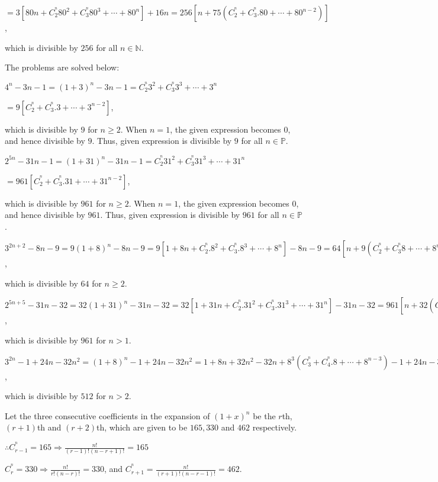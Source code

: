   $= 3[80n + C_2^^n80^2 + C_3^^n80^3 + \cdots + 80^n] + 16n = 256[n + 75(C_2^^n + C_3^^n.80 + \cdots + 80^{n
    - 2})]$,

  which is divisible by $256$ for all $n\in\mathbb{N}$.
\item The problems are solved below:
  \startitemize[i]
  \item $4^n - 3n - 1 = (1 + 3)^n - 3n - 1 = C_2^^n3^2 + C_3^^n3^3 + \cdots + 3^n$

    $= 9[C_2^^n + C_3^^n.3 + \cdots + 3^{n - 2}]$,

    which is divisible by $9$ for $n\geq 2$. When $n = 1$, the given expression becomes $0$, and hence
    divisible by $9$. Thus, given expression is divisible by $9$ for all $n\in\mathbb{P}$.
  \item $2^{5n} - 31n - 1 = (1 + 31)^n - 31n - 1 = C_2^^n31^2 + C_3^^n31^3 + \cdots + 31^n$

    $= 961[C_2^^n + C_3^^n.31 + \cdots + 31^{n - 2}]$,

    which is divisible by $961$ for $n\geq 2$. When $n = 1$, the given expression becomes $0$, and hence
    divisible by $961$. Thus, given expression is divisible by $961$ for all $n\in\mathbb{P}$.
  \item $3^{2n + 2} - 8n - 9 = 9(1 + 8)^n - 8n - 9 = 9[1 + 8n + C_2^^n.8^2 + C_3^^n.8^3 + \cdots + 8^n] - 8n
    - 9 = 64[n + 9(C_2^^n + C_3^^n8 + \cdots + 8^{n - 2})]$,

    which is divisible by $64$ for $n\geq 2$.
  \item $2^{5n + 5} - 31n - 32 = 32(1 + 31)^n - 31n - 32 = 32[1 + 31n + C_2^^n.31^2 + C_3^^n.31^3 + \cdots +
    31^n] - 31n - 32 = 961[n + 32(C_2^^n + C_3^^n31 + \cdots + 31^{n - 2})]$,

    which is divisible by $961$ for $n > 1$.
  \item $3^{2n} - 1 + 24n - 32n^2 = (1 + 8)^n - 1 + 24n - 32n^2 = 1 + 8n + 32n^2 - 32n + 8^3(C_3^^n +
    C_4^^n.8 + \cdots + 8^{n - 3}) - 1 + 24n - 32n^2 = 8^3(C_3^^n +
    C_4^^n.8 + \cdots + 8^{n - 3})$,

    which is divisible by $512$ for $n > 2$.
  \stopitemize
\item Let the three consecutive coefficients in the expansion of $(1 + x)^n$ be the $r$th, $(r + 1)$th and
  $(r + 2)$th, which are given to be $165, 330$ and $462$ respectively.

  $\therefore C_{r - 1}^^n = 165 \Rightarrow \frac{n!}{(r - 1)!(n - r + 1)!} = 165$

  $C_r^^n = 330 \Rightarrow \frac{n!}{r!(n - r)!} = 330$, and $C_{r + 1}^^n = \frac{n!}{(r + 1)!(n - r -
  1)!} = 462$.

